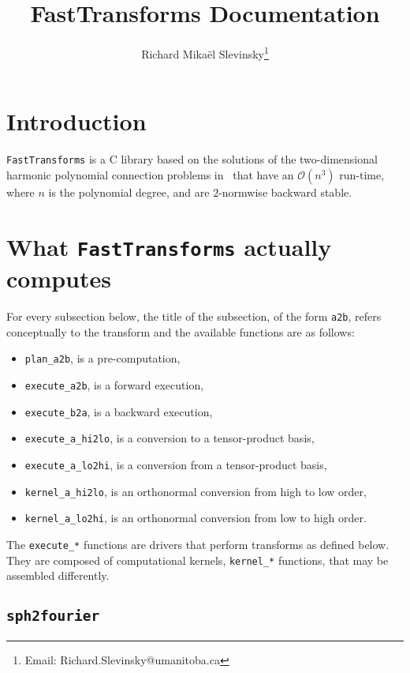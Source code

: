 \documentclass{article}
\begin{document}
\title{FastTransforms Documentation}

\author{Richard Mika\"el Slevinsky\thanks{Email: Richard.Slevinsky@umanitoba.ca}}

\maketitle

\section{Introduction}

{\tt FastTransforms} is a C library based on the solutions of the two-dimensional harmonic polynomial connection problems in~\cite{Slevinsky-ACHA-17,Slevinsky-1711-07866} that have an $\mathcal{O}(n^3)$ run-time, where $n$ is the polynomial degree, and are $2$-normwise backward stable.

\section{What {\tt FastTransforms} actually computes}

For every subsection below, the title of the subsection, of the form \verb+a2b+, refers conceptually to the transform and the available functions are as follows:
\begin{itemize}
\item \verb+plan_a2b+, is a pre-computation,
\item \verb+execute_a2b+, is a forward execution,
\item \verb+execute_b2a+, is a backward execution,
\item \verb+execute_a_hi2lo+, is a conversion to a tensor-product basis,
\item \verb+execute_a_lo2hi+, is a conversion from a tensor-product basis,
\item \verb+kernel_a_hi2lo+, is an orthonormal conversion from high to low order,
\item \verb+kernel_a_lo2hi+, is an orthonormal conversion from low to high order.
\end{itemize}
The \verb+execute_*+ functions are drivers that perform transforms as defined below. They are composed of computational kernels, \verb+kernel_*+ functions, that may be assembled differently.

\subsection{{\tt sph2fourier}}
\end{document}
